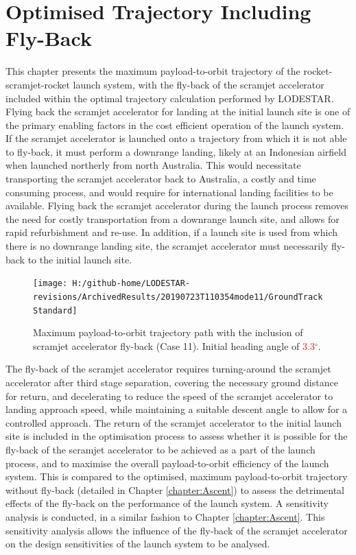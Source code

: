
\cleardoublepage
\chapter{Optimised Trajectory Including Fly-Back}\label{chapter:Flyback}
	
This chapter presents the maximum payload-to-orbit trajectory of the rocket-scramjet-rocket launch system, with the fly-back of the scramjet accelerator included within the optimal trajectory calculation performed by LODESTAR. 
Flying back the scramjet accelerator for landing at the initial launch site is one of the primary enabling factors in the cost efficient operation of the launch system. If the scramjet accelerator is launched onto a trajectory from which it is not able to fly-back, it must perform a downrange landing, likely at an Indonesian airfield when launched northerly from north Australia. This would necessitate transporting the scramjet accelerator back to Australia, a costly and time consuming process, and would require for international landing facilities to be available. 
Flying back the scramjet accelerator during the launch process removes the need for costly transportation from a downrange launch site, and allows for rapid refurbishment and re-use.
In addition, if a launch site is used from which there is no downrange landing site, the scramjet accelerator must necessarily fly-back to the initial launch site. 


\begin{figure}[ht]%
	\centering
	\texttt{[image: H:/github-home/LODESTAR-revisions/ArchivedResults/20190723T110354mode11/GroundTrackStandard]}
	\caption{Maximum payload-to-orbit trajectory path with the inclusion of scramjet accelerator fly-back (Case 11). Initial heading angle of \textcolor{red}{3.3}$^\circ$.} %
	\label{fig:GroundTrackStandard}
\end{figure}

The fly-back of the scramjet accelerator requires turning-around the scramjet accelerator after third stage separation, covering the necessary ground distance for return, and decelerating to reduce the speed of the scramjet accelerator to landing approach speed, while maintaining a suitable descent angle to allow for a controlled approach. 
The return of the scramjet accelerator to the initial launch site is included in the optimisation process to assess whether it is possible for the fly-back of the scramjet accelerator to be achieved as a part of the launch process, and to maximise the overall payload-to-orbit efficiency of the launch system. This is compared to the optimised, maximum payload-to-orbit trajectory without fly-back (detailed in Chapter \ref{chapter:Ascent}) to assess the detrimental effects of the fly-back on the performance of the launch system. 
A sensitivity analysis is conducted, in a similar fashion to Chapter \ref{chapter:Ascent}. 
This sensitivity analysis allows the influence of the fly-back of the scramjet accelerator on the design sensitivities of the launch system to be analysed.


